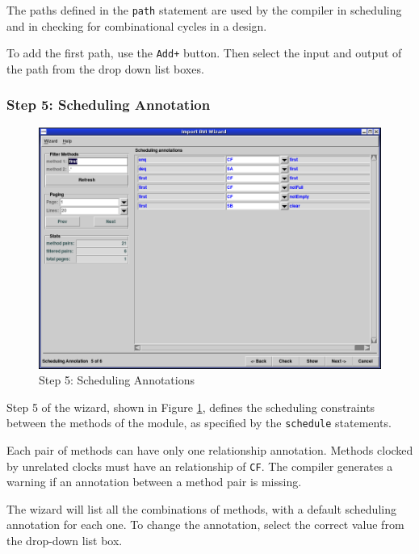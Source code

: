 \documentclass{article}
\newcommand{\te}[1]{\texttt{#1}}
\begin{document}
The paths defined in the \te{path} statement are used by the compiler
in scheduling
and in checking for combinational cycles in a design.

To add the first path, use the \te{Add+} button. Then select the input
and output of the path from the drop down list boxes.


\subsubsection{Step 5: Scheduling Annotation}

\begin{figure}[htbp]
\begin{center}
\includegraphics[width = 5 in]{figures/importbvi5}
\caption{Step 5: Scheduling Annotations }
\label{fig-importbvi5}
\end{center}
\end{figure}

Step 5 of the wizard, shown in Figure \ref{fig-importbvi5},  defines the scheduling constraints between the
methods of the module, as specified
by the \te{schedule} statements.

Each pair of methods can have only one relationship annotation.  Methods
clocked by unrelated clocks must have an relationship of \te{CF}.
The compiler generates a warning if an annotation between a method
pair is missing.

The wizard will list all the combinations of methods, with a default
scheduling annotation for each one.  To change the annotation, select
the correct value from the drop-down list box.
\end{document}
